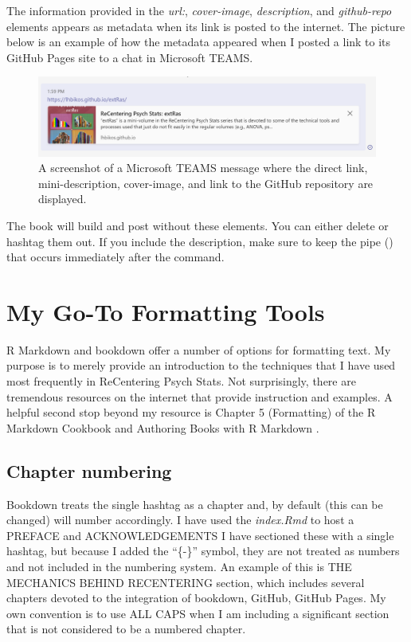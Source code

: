 \documentclass[
]{book}
\begin{document}
The information provided in the \emph{url:}, \emph{cover-image}, \emph{description}, and \emph{github-repo} elements appears as metadata when its link is posted to the internet. The picture below is an example of how the metadata appeared when I posted a link to its GitHub Pages site to a chat in Microsoft TEAMS.

\begin{figure}
\centering
\includegraphics{images/preview.png}
\caption{A screenshot of a Microsoft TEAMS message where the direct link, mini-description, cover-image, and link to the GitHub repository are displayed.}
\end{figure}

The book will build and post without these elements. You can either delete or hashtag them out. If you include the description, make sure to keep the pipe (\textbar) that occurs immediately after the command.

\hypertarget{my-go-to-formatting-tools}{%
\section{My Go-To Formatting Tools}\label{my-go-to-formatting-tools}}

R Markdown and bookdown offer a number of options for formatting text. My purpose is to merely provide an introduction to the techniques that I have used most frequently in ReCentering Psych Stats. Not surprisingly, there are tremendous resources on the internet that provide instruction and examples. A helpful second stop beyond my resource is Chapter 5 (Formatting) of the R Markdown Cookbook \citep{xie_r_2021} and Authoring Books with R Markdown \citep{xie_r_2021}.

\hypertarget{chapter-numbering}{%
\subsection{Chapter numbering}\label{chapter-numbering}}

Bookdown treats the single hashtag as a chapter and, by default (this can be changed) will number accordingly. I have used the \emph{index.Rmd} to host a PREFACE and ACKNOWLEDGEMENTS I have sectioned these with a single hashtag, but because I added the ``\{-\}'' symbol, they are not treated as numbers and not included in the numbering system. An example of this is THE MECHANICS BEHIND RECENTERING section, which includes several chapters devoted to the integration of bookdown, GitHub, GitHub Pages. My own convention is to use ALL CAPS when I am including a significant section that is not considered to be a numbered chapter.
\end{document}
